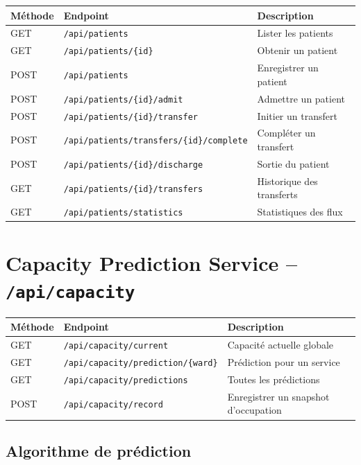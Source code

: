 \documentclass[12pt,a4paper]{report}
\begin{document}
\begin{longtable}{llp{7cm}}
    \toprule
    \textbf{M\'ethode} & \textbf{Endpoint} & \textbf{Description} \\
    \midrule
    \endhead
    GET & \texttt{/api/patients} & Lister les patients \\
    GET & \texttt{/api/patients/\{id\}} & Obtenir un patient \\
    POST & \texttt{/api/patients} & Enregistrer un patient \\
    POST & \texttt{/api/patients/\{id\}/admit} & Admettre un patient \\
    POST & \texttt{/api/patients/\{id\}/transfer} & Initier un transfert \\
    POST & \texttt{/api/patients/transfers/\{id\}/complete} & Compl\'eter un transfert \\
    POST & \texttt{/api/patients/\{id\}/discharge} & Sortie du patient \\
    GET & \texttt{/api/patients/\{id\}/transfers} & Historique des transferts \\
    GET & \texttt{/api/patients/statistics} & Statistiques des flux \\
    \bottomrule
\end{longtable}

\section{Capacity Prediction Service -- \texttt{/api/capacity}}

\begin{longtable}{llp{7cm}}
    \toprule
    \textbf{M\'ethode} & \textbf{Endpoint} & \textbf{Description} \\
    \midrule
    \endhead
    GET & \texttt{/api/capacity/current} & Capacit\'e actuelle globale \\
    GET & \texttt{/api/capacity/prediction/\{ward\}} & Pr\'ediction pour un service \\
    GET & \texttt{/api/capacity/predictions} & Toutes les pr\'edictions \\
    POST & \texttt{/api/capacity/record} & Enregistrer un snapshot d'occupation \\
    \bottomrule
\end{longtable}

\subsection{Algorithme de pr\'ediction}
\end{document}
